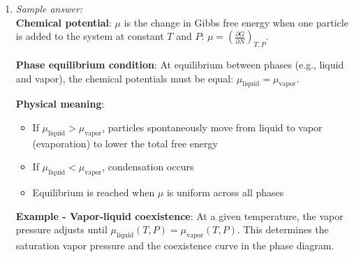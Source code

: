 \documentclass[11pt]{article}
\begin{document}
\begin{enumerate}[label=\textbf{\arabic*.}]
  \textbf{Adiabatic process} ($Q = 0$):
  \begin{itemize}
    \item Temperature decreases during expansion: $T_f < T_i$
    \item $\Delta U = -W$ (work comes from internal energy)
    \item Entropy remains constant: $\Delta S = 0$ (reversible adiabatic process)
    \item The gas cools because it does work against external pressure without heat input
  \end{itemize}

  \textbf{Key difference}: Isothermal processes maintain temperature via heat exchange; adiabatic 
  processes are thermally isolated, so temperature changes as work is done.

  \item \emph{Sample answer:}\\
  \textbf{Chemical potential}: $\mu$ is the change in Gibbs free energy when one particle is added 
  to the system at constant $T$ and $P$: $\mu = \left(\frac{\partial G}{\partial N}\right)_{T,P}$.

  \textbf{Phase equilibrium condition}: At equilibrium between phases (e.g., liquid and vapor), the 
  chemical potentials must be equal: $\mu_\text{liquid} = \mu_\text{vapor}$.

  \textbf{Physical meaning}:
  \begin{itemize}
    \item If $\mu_\text{liquid} > \mu_\text{vapor}$, particles spontaneously move from liquid to vapor 
    (evaporation) to lower the total free energy
    \item If $\mu_\text{liquid} < \mu_\text{vapor}$, condensation occurs
    \item Equilibrium is reached when $\mu$ is uniform across all phases
  \end{itemize}

  \textbf{Example - Vapor-liquid coexistence}: At a given temperature, the vapor pressure adjusts 
  until $\mu_\text{liquid}(T,P) = \mu_\text{vapor}(T,P)$. This determines the saturation vapor 
  pressure and the coexistence curve in the phase diagram.

\end{enumerate}
\end{document}

